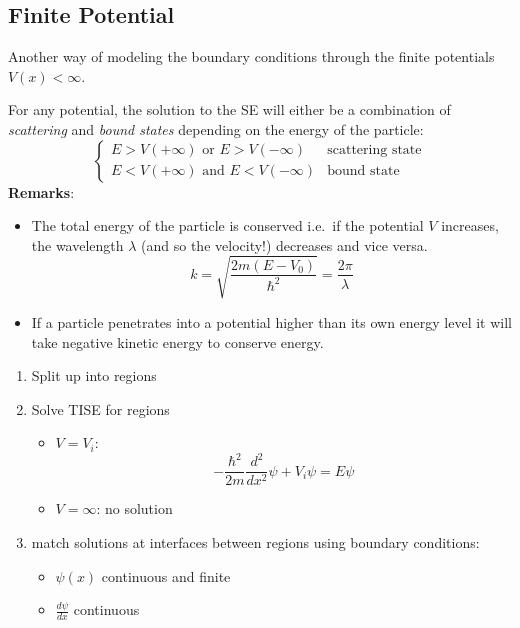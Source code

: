 \subsection{Finite Potential}
Another way of modeling the boundary conditions through the finite potentials $V(x) < \infty$.

For any potential, the solution to the SE will either be a combination of \textit{scattering} and \textit{bound states} depending on the energy of the particle:
\noindent\begin{equation*}
    \begin{cases}
        E > V(+\infty)\text{ or } E > V(-\infty)  & \text{scattering state} \\
        E < V(+\infty)\text{ and } E < V(-\infty) & \text{bound state}
    \end{cases}
\end{equation*}
\textbf{Remarks}:

\begin{itemize}
    \item The total energy of the particle is conserved i.e.\ if the potential $V$ increases, the wavelength $\lambda$ (and so the velocity!) decreases and vice versa.
          \noindent\begin{equation*}
              k=\sqrt{\frac{2m(E-V_0)}{\hbar^2}} = \frac{2\pi}{\lambda}
          \end{equation*}
    \item If a particle penetrates into a potential higher than its own energy level it will take negative kinetic energy to conserve energy.
\end{itemize}

\begin{enumerate}
    \item Split up into regions
    \item Solve TISE for regions
          \begin{itemize}
              \item $V=V_i$:
                    \noindent\begin{equation*}
                        -\frac{\hbar^2}{2m}\frac{d^2}{dx^2} \psi + V_i\psi=E\psi
                    \end{equation*}
              \item $V=\infty$: no solution
          \end{itemize}
    \item match solutions at interfaces between regions using boundary conditions:
          \begin{itemize}
              \item $\psi(x)$ continuous and finite
              \item $\frac{d\psi}{dx}$ continuous
          \end{itemize}
\end{enumerate}

